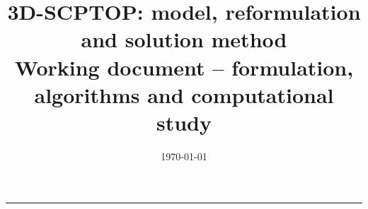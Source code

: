 \documentclass[11pt]{article}
\title{3D-SCPTOP: model, reformulation and solution method\\
\large Working document -- formulation, algorithms and computational study}
\date{\today}
\begin{document}
\maketitle
\tableofcontents
\bigskip
\hrule
\bigskip



\printbibliography
\end{document}
